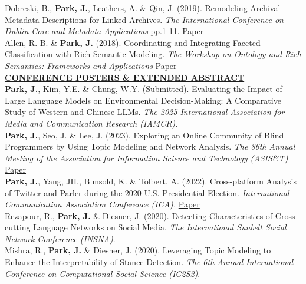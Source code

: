 \documentclass{article}
\begin{document}
\noindent Dobreski, B., \textbf{Park, J.}, Leathers, A. \& Qin, J. (2019). Remodeling Archival Metadata Descriptions for Linked Archives. \textit{The International Conference on Dublin Core and Metadata Applications} pp.1-11. \hfill \href{https://dcpapers.dublincore.org/article/952141553}{Paper} \\ 

\noindent Allen, R. B. \& \textbf{Park, J.} (2018). Coordinating and Integrating Faceted Classification with Rich Semantic Modeling. \textit{The Workshop on Ontology and Rich Semantics: Frameworks and Applications} \hfill \href{https://arxiv.org/abs/1809.09548}{Paper} \\

\noindent \textbf{\underline{CONFERENCE POSTERS \& EXTENDED ABSTRACT}} \\
\noindent \textbf{Park, J.}, Kim, Y.E. \& Chung, W.Y. (Submitted). Evaluating the Impact of Large Language Models on Environmental Decision-Making: A Comparative Study of Western and Chinese LLMs. \textit{The 2025 International Association for Media and Communication Research (IAMCR).} \\  

\noindent \textbf{Park, J.}, Seo, J. \& Lee, J. (2023). Exploring an Online Community of Blind Programmers by Using Topic Modeling and Network Analysis. \textit{The 86th Annual Meeting of the Association for Information Science and Technology (ASIS\&T)} \hfill \href{https://doi.org/10.1002/pra2.956}{Paper} \\

\noindent \textbf{Park, J.}, Yang, JH., Bunsold, K. \& Tolbert, A. (2022). Cross-platform Analysis of Twitter and Parler during the 2020 U.S. Presidential Election. \textit{International Communication Association Conference (ICA).} \hfill \href{https://www.ideals.illinois.edu/items/121292}{Paper} \\ 

\noindent Rezapour, R., \textbf{Park, J.} \& Diesner, J. (2020). Detecting Characteristics of Cross-cutting Language Networks on Social Media. \textit{The International Sunbelt Social Network Conference (INSNA)}. \\

\noindent Mishra, R., \textbf{Park, J.} \& Diesner, J. (2020). Leveraging Topic Modeling to Enhance the Interpretability of Stance Detection. \textit{The 6th Annual International Conference on Computational Social Science (IC2S2)}. \\
\end{document}
